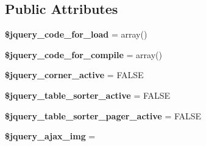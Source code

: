 \subsection*{Public Attributes}
\begin{DoxyCompactItemize}
\item 
\mbox{\label{class_c_i___jquery_a7ae8875ef9ba5a43241cd16164fd32de}} 
{\bfseries \$jquery\+\_\+code\+\_\+for\+\_\+load} = array()
\item 
\mbox{\label{class_c_i___jquery_ab253865f9e4b5f092df1bb823791aa52}} 
{\bfseries \$jquery\+\_\+code\+\_\+for\+\_\+compile} = array()
\item 
\mbox{\label{class_c_i___jquery_a2156188b0ad2bd93db2a88fb4c8ca100}} 
{\bfseries \$jquery\+\_\+corner\+\_\+active} = F\+A\+L\+SE
\item 
\mbox{\label{class_c_i___jquery_a5190b0d0dd1484f377a0d9c980be88b7}} 
{\bfseries \$jquery\+\_\+table\+\_\+sorter\+\_\+active} = F\+A\+L\+SE
\item 
\mbox{\label{class_c_i___jquery_a0c51c1d1981e9fd1e788268db38a14ad}} 
{\bfseries \$jquery\+\_\+table\+\_\+sorter\+\_\+pager\+\_\+active} = F\+A\+L\+SE
\item 
\mbox{\label{class_c_i___jquery_aac92e6bf620f45d0ec6e79e064487ef4}} 
{\bfseries \$jquery\+\_\+ajax\+\_\+img} = \textquotesingle{}\textquotesingle{}
\end{DoxyCompactItemize}
